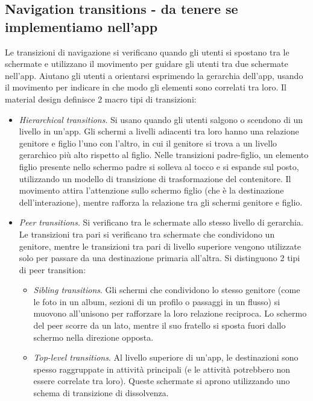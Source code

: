 \documentclass[12pt, a4paper]{report}
\begin{document}
    		\subsection{Navigation transitions - da tenere se implementiamo nell'app}
    		Le transizioni di navigazione si verificano quando gli utenti si spostano tra le schermate e utilizzano il movimento per guidare gli utenti tra due schermate nell'app. Aiutano gli utenti
    		a orientarsi esprimendo la gerarchia dell'app, usando il movimento per indicare in che modo gli elementi sono correlati tra loro. Il material design definisce 2 macro tipi di transizioni:
    		\begin{itemize}
    			\item \textit{Hierarchical transitions}. Si usano quando gli utenti salgono o scendono di un livello in un'app. Gli schermi a livelli adiacenti tra loro hanno una relazione genitore e
    			figlio l'uno con l'altro, in cui il genitore si trova a un livello gerarchico più alto rispetto al figlio. Nelle transizioni padre-figlio, un elemento figlio presente nello schermo padre
    			si solleva al tocco e si espande sul posto, utilizzando un modello di transizione di trasformazione del contenitore. Il movimento attira l'attenzione sullo schermo figlio (che è la destinazione
    			dell'interazione), mentre rafforza la relazione tra gli schermi genitore e figlio.
    			\item \textit{Peer transitions}. Si verificano tra le schermate allo stesso livello di gerarchia. Le transizioni tra pari si verificano tra schermate che condividono un genitore, mentre le transizioni tra pari
    			di livello superiore vengono utilizzate solo per passare da una destinazione primaria all'altra. Si distinguono 2 tipi di peer transition:
    			\begin{itemize}
    				\item \textit{Sibling transitions}. Gli schermi che condividono lo stesso genitore (come le foto in un album, sezioni di un profilo o passaggi in un flusso) si muovono all'unisono per
    				rafforzare la loro relazione reciproca. Lo schermo del peer scorre da un lato, mentre il suo fratello si sposta fuori dallo schermo nella direzione opposta.
    				\item \textit{Top-level transitions}. Al livello superiore di un'app, le destinazioni sono spesso raggruppate in attività principali (e le attività potrebbero non essere correlate tra loro).
    				Queste schermate si aprono utilizzando uno schema di transizione di dissolvenza.
    			\end{itemize}
    		\end{itemize}
	
\end{document}
